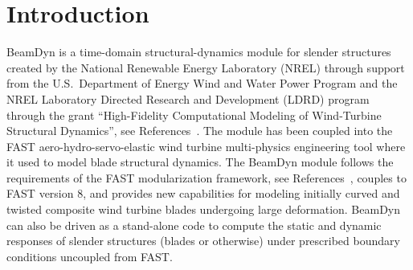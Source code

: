 \chapter{Introduction}
BeamDyn is a time-domain structural-dynamics module for slender structures created by the National Renewable Energy Laboratory (NREL) through support from the U.S.\ Department of Energy Wind and Water Power Program and the NREL Laboratory Directed Research and Development (LDRD) program through the grant ``High-Fidelity Computational Modeling of Wind-Turbine Structural Dynamics'', see References~\cite{Wang:SFE2013, Wang:GEBT2013,Wang:GEBT2014,Wang:2015}. The module has been coupled into the FAST aero-hydro-servo-elastic wind turbine multi-physics engineering tool where it used to model blade structural dynamics. 
The BeamDyn module follows the requirements of the FAST modularization framework, see References~\cite{Jonkman:2013,Sprague:2013,Sprague:2014,website:FASTModularizationFramework}, couples to FAST version 8, and provides new capabilities for modeling initially curved and twisted composite wind turbine blades undergoing large deformation. 
BeamDyn can also be driven as a stand-alone code to compute the static and dynamic responses of slender structures (blades or otherwise) under prescribed boundary conditions uncoupled from FAST.

